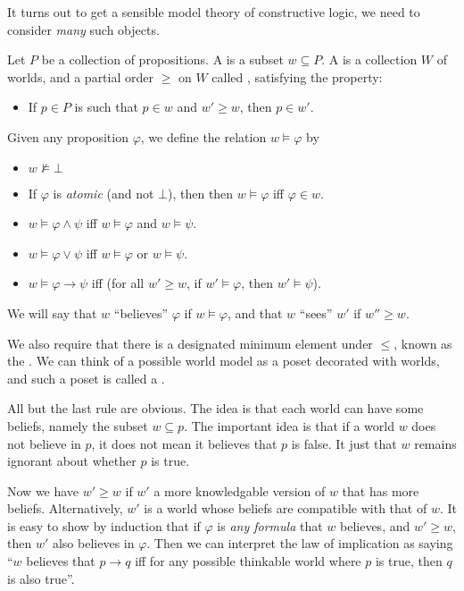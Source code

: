 \documentclass[a4paper]{article}
\begin{document}
It turns out to get a sensible model theory of constructive logic, we need to consider \emph{many} such objects.

\begin{defi}
  Let $P$ be a collection of propositions. A  is a subset $w \subseteq P$. A  is a collection $W$ of worlds, and a partial order $\geq$ on $W$ called , satisfying the  property:
  \begin{itemize}
    \item If $p \in P$ is such that $p \in w$ and $w' \geq w$, then $p \in w'$.
  \end{itemize}
  Given any proposition $\varphi$, we define the relation $w \vDash \varphi$ by
  \begin{itemize}
    \item $w \not\vDash \bot$
    \item If $\varphi$ is \emph{atomic} (and not $\bot$), then then $w \vDash \varphi$ iff $\varphi \in w$.
    \item $w \vDash \varphi \wedge \psi$ iff $w \vDash \varphi$ and $w \vDash \psi$.
    \item $w \vDash \varphi \vee \psi$ iff $w \vDash \varphi$ or $w \vDash \psi$.
    \item $w \vDash \varphi \to \psi$ iff (for all $w' \geq w$, if $w' \vDash \varphi$, then $w' \vDash \psi$).
  \end{itemize}
  We will say that $w$ ``believes'' $\varphi$ if $w \vDash \varphi$, and that $w$ ``sees'' $w'$ if $w'' \geq w$.

  We also require that there is a designated minimum element under $\leq$, known as the . We can think of a possible world model as a poset decorated with worlds, and such a poset is called a . %
\end{defi}
All but the last rule are obvious. The idea is that each world can have some beliefs, namely the subset $w \subseteq p$. The important idea is that if a world $w$ does not believe in $p$, it does not mean it believes that $p$ is false. It just that $w$ remains ignorant about whether $p$ is true.

Now we have $w' \geq w$ if $w'$ a more knowledgable version of $w$ that has more beliefs. Alternatively, $w'$ is a world whose beliefs are compatible with that of $w$. It is easy to show by induction that if $\varphi$ is \emph{any formula} that $w$ believes, and $w' \geq w$, then $w'$ also believes in $\varphi$. Then we can interpret the law of implication as saying ``$w$ believes that $p \to q$ iff for any possible thinkable world where $p$ is true, then $q$ is also true''.
\end{document}

